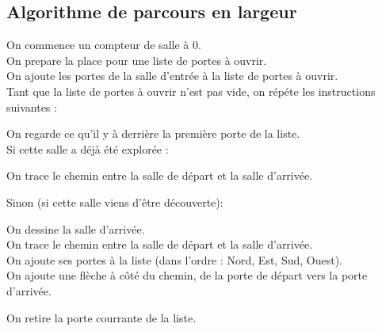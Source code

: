 \documentclass{article}
\begin{document}
        \subsection{Algorithme de parcours en largeur}
            \label{AlgoLargeur}
            \noindent
            On commence un compteur de salle à 0. \\
            On prepare la place pour une liste de portes à ouvrir. \\
            On ajoute les portes de la salle d'entrée à la liste de portes à ouvrir. \\
            Tant que la liste de portes à ouvrir n'est pas vide, on répéte les instructions suivantes :
            \begin{adjustwidth}{1cm}{}
                On regarde ce qu'il y à derrière la première porte de la liste. \\
                Si cette salle a déjà été explorée :
                \begin{adjustwidth}{1cm}{}
                    On trace le chemin entre la salle de départ et la salle d'arrivée.
                \end{adjustwidth}
                Sinon (si cette salle viens d'être découverte):
                \begin{adjustwidth}{1cm}{}
                    On dessine la salle d'arrivée.\\
                    On trace le chemin entre la salle de départ et la salle d'arrivée.\\
                    On ajoute ses portes à la liste (dans l'ordre : Nord, Est, Sud, Ouest).\\
                    On ajoute une flèche à côté du chemin, de la porte de départ vers la porte d'arrivée.
                \end{adjustwidth}
                On retire la porte courrante de la liste.
            \end{adjustwidth}
\end{document}
